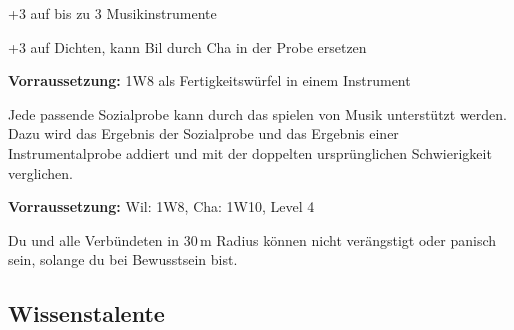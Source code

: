 \documentclass[../../Heldenanleitung2]{subfiles}
\begin{document}
\begin{multicols}{2}
\begin{tcolorbox}[title={Vielseitiger Musikant}, colbacktitle=yellow, coltitle=black]    
   +3 auf bis zu 3 Musikinstrumente
\end{tcolorbox}

\begin{tcolorbox}[title={Dichter}, colbacktitle=yellow, coltitle=black]    
   +3 auf Dichten, kann Bil durch Cha in der Probe ersetzen
\end{tcolorbox}

\begin{tcolorbox}[title={Überzeugende Musik}, colbacktitle=yellow, coltitle=black]    
	\textbf{Vorraussetzung:} 1W8 als Fertigkeitswürfel in einem Instrument
	\vspace{0.2cm}
	
   Jede passende Sozialprobe kann durch das spielen von Musik unterstützt werden. Dazu wird das Ergebnis der Sozialprobe und das Ergebnis einer Instrumentalprobe addiert und mit der doppelten ursprünglichen Schwierigkeit verglichen.
\end{tcolorbox}

\begin{tcolorbox}[title={Furchtloser Anführer}, colbacktitle=yellow, coltitle=black]    
	\textbf{Vorraussetzung:} Wil: 1W8, Cha: 1W10, Level 4
	\vspace{0.2cm}
	
    Du und alle Verbündeten in 30\,m Radius können nicht verängstigt oder panisch sein, solange du bei Bewusstsein bist.
\end{tcolorbox}

\end{multicols}

\subsection{Wissenstalente}
\end{document}
